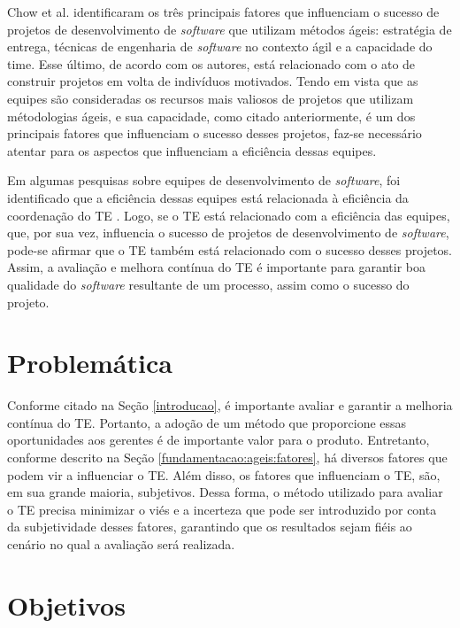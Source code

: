 Chow et al. \cite{chow} identificaram os três principais fatores que influenciam o sucesso de projetos de desenvolvimento de \textit{software} que utilizam métodos ágeis: estratégia de entrega, técnicas de engenharia de \textit{software} no contexto ágil e a capacidade do time. Esse último, de acordo com os autores, está relacionado com o ato de construir projetos em volta de indivíduos motivados. Tendo em vista que as equipes são consideradas os recursos mais valiosos de projetos que utilizam métodologias ágeis, e sua capacidade, como citado anteriormente, é um dos principais fatores que influenciam o sucesso desses projetos, faz-se necessário atentar para os aspectos que influenciam a eficiência dessas equipes.

Em algumas pesquisas sobre equipes de desenvolvimento de \textit{software}, foi identificado que a eficiência dessas equipes está relacionada à eficiência da coordenação do TE \cite{kraut} \cite{hoegl}. Logo, se o TE está relacionado com a eficiência das equipes, que, por sua vez, influencia o sucesso de projetos de desenvolvimento de \textit{software}, pode-se afirmar que o TE também está relacionado com o sucesso desses projetos. Assim, a avaliação e melhora contínua do TE é importante para garantir boa qualidade do \textit{software} resultante de um processo, assim como o sucesso do projeto.

\section{Problemática}
\label{introducao:problematica}

Conforme citado na Seção \ref{introducao}, é importante avaliar e garantir a melhoria contínua do TE. Portanto, a adoção de um método que proporcione essas oportunidades aos gerentes é de importante valor para o produto. Entretanto, conforme descrito na Seção \ref{fundamentacao:ageis:fatores}, há diversos fatores que podem vir a influenciar o TE. Além disso, os fatores que influenciam o TE, são, em sua grande maioria, subjetivos. Dessa forma, o método utilizado para avaliar o TE precisa minimizar o viés e a incerteza que pode ser introduzido por conta da subjetividade desses fatores, garantindo que os resultados sejam fiéis ao cenário no qual a avaliação será realizada.

\section{Objetivos}
\label{introducao:objetivos}

